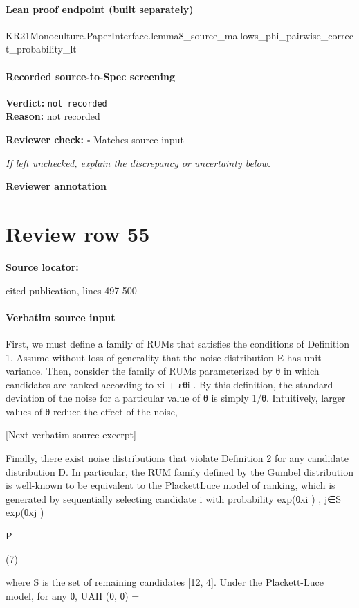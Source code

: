 \documentclass[10pt]{article}
\newcommand{\reviewerbox}{%
  \par\noindent\fbox{\parbox{0.96\linewidth}{\rule{0pt}{0.38in}}}\par
}
\newcommand{\reviewmatch}[1]{%
  \par\noindent\textbf{Reviewer check:} $\square$\; #1\par
  \noindent\emph{If left unchecked, explain the discrepancy or uncertainty below.}\par
}
\begin{document}
\paragraph{Lean proof endpoint (built separately)}\begin{ReviewVerbatim}
KR21Monoculture.PaperInterface.lemma8_source_mallows_phi_pairwise_correct_probability_lt
\end{ReviewVerbatim}

\paragraph{Recorded source-to-Spec screening}
\textbf{Verdict:} \texttt{not recorded}
\\
\textbf{Reason:} not recorded
\reviewmatch{Matches source input}
\noindent\textbf{Reviewer annotation}\par
\reviewerbox
\clearpage
\hypertarget{source-claim-2d4c1840ef47dce5}{}
\section*{Review row 55}
\textbf{Source locator:} {\footnotesize\raggedright cited publication, lines 497-\allowbreak{}500\par}
\paragraph{Verbatim source input}
\begin{ReviewVerbatim}
First, we must define a family of RUMs that satisfies the conditions of Definition 1. Assume without loss of
generality that the noise distribution E has unit variance. Then, consider the family of RUMs parameterized
by θ in which candidates are ranked according to xi + εθi . By this definition, the standard deviation of the
noise for a particular value of θ is simply 1/θ. Intuitively, larger values of θ reduce the effect of the noise,

[Next verbatim source excerpt]

Finally, there exist noise distributions that violate Definition 2 for any candidate distribution D. In
particular, the RUM family defined by the Gumbel distribution is well-known to be equivalent to the PlackettLuce model of ranking, which is generated by sequentially selecting candidate i with probability
exp(θxi )
,
j∈S exp(θxj )

P

(7)

where S is the set of remaining candidates [12, 4]. Under the Plackett-Luce model, for any θ, UAH (θ, θ) =
\end{ReviewVerbatim}
\end{document}
